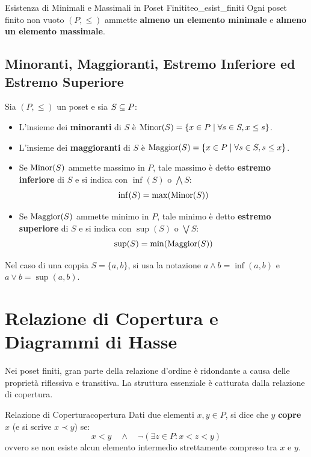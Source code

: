 \begin{teorema}{Esistenza di Minimali e Massimali in Poset Finiti}{teo_esist_finiti}
Ogni poset finito non vuoto $(P, \le)$ ammette \textbf{almeno un elemento minimale} e \textbf{almeno un elemento massimale}.
\end{teorema}

\subsection{Minoranti, Maggioranti, Estremo Inferiore ed Estremo Superiore}

Sia $(P, \le)$ un poset e sia $S \subseteq P$:
\begin{itemize}
    \item L'insieme dei \textbf{minoranti} di $S$ è $\operatorname{Minor}(S) = \{x \in P \mid \forall s \in S, x \le s\}$.
    \item L'insieme dei \textbf{maggioranti} di $S$ è $\operatorname{Maggior}(S) = \{x \in P \mid \forall s \in S, s \le x\}$.
    \item Se $\operatorname{Minor}(S)$ ammette massimo in $P$, tale massimo è detto \textbf{estremo inferiore} di $S$ e si indica con $\inf(S)$ o $\bigwedge S$:
    \[
        \inf(S) = \max(\operatorname{Minor}(S))
    \]
    \item Se $\operatorname{Maggior}(S)$ ammette minimo in $P$, tale minimo è detto \textbf{estremo superiore} di $S$ e si indica con $\sup(S)$ o $\bigvee S$:
    \[
        \sup(S) = \min(\operatorname{Maggior}(S))
    \]
\end{itemize}

Nel caso di una coppia $S = \{a, b\}$, si usa la notazione $a \wedge b = \inf(a, b)$ e $a \vee b = \sup(a, b)$.

\section{Relazione di Copertura e Diagrammi di Hasse}

Nei poset finiti, gran parte della relazione d'ordine è ridondante a causa delle proprietà riflessiva e transitiva. La struttura essenziale è catturata dalla relazione di copertura.

\begin{definizione}{Relazione di Copertura}{copertura}
Dati due elementi $x, y \in P$, si dice che $y$ \textbf{copre} $x$ (e si scrive $x \prec y$) se:
\[
    x < y \quad \wedge \quad \neg(\exists z \in P : x < z < y)
\]
ovvero se non esiste alcun elemento intermedio strettamente compreso tra $x$ e $y$.
\end{definizione}

